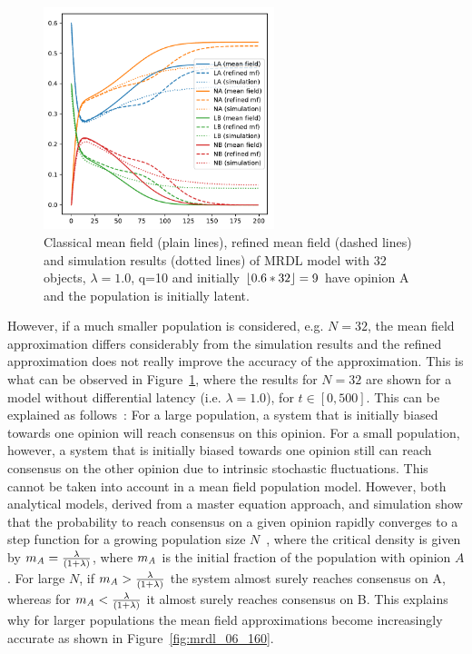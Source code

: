 \documentclass{amsart}
\begin{document}
\begin{figure}[ht]
  \begin{center}
    \includegraphics[width=0.6\textwidth]{MajorityRule_all_N32}
\end{center}
\caption{\label{fig:mrdl_06_32} Classical mean field (plain lines),
  refined mean field (dashed lines) and simulation results (dotted
  lines) of MRDL model with 32 objects, $\lambda=1.0$, q=10 and
  initially $\left\lfloor0.6*32\right\rfloor=9$ have opinion A and the population is
  initially latent. }
\end{figure}

However, if a much smaller population is considered, e.g. $N=32$, the
mean field approximation differs considerably from the simulation
results and the refined approximation does not really improve the
accuracy of the approximation. This is what can be observed in
Figure~\ref{fig:mrdl_06_32}, where the results for $N=32$ are shown for a
model without differential latency (i.e. $\lambda=1.0$), for $t\in [0,500]$.  This can be
explained as follows~: For a large population, a system that is
initially biased towards one opinion will reach consensus on this
opinion. For a small population, however, a system that is initially
biased towards one opinion still can reach consensus on the other
opinion due to intrinsic stochastic fluctuations. This cannot be
taken into account in a mean field population model.  However, both
analytical models, derived from a master equation approach, and
simulation show that the probability to reach consensus on a given
opinion rapidly converges to a step function for a growing population
size $N$~\cite{Sch11}, where the critical density is given by
$m_{\mathit{A}}=\frac{\lambda}{(1+\lambda)}$, where $m_{\mathit{A}}$ is the initial
fraction of the population with opinion $A$. For large $N$, if
$m_{\mathit{A}}>\frac{\lambda}{(1+\lambda)}$ the system almost surely reaches
consensus on A, whereas for $m_{\mathit{A}}<\frac{\lambda}{(1+\lambda)}$ it
almost surely reaches consensus on B.  This explains why for larger
populations the mean field approximations become increasingly accurate
as shown in Figure~\ref{fig:mrdl_06_160}.
\end{document}
